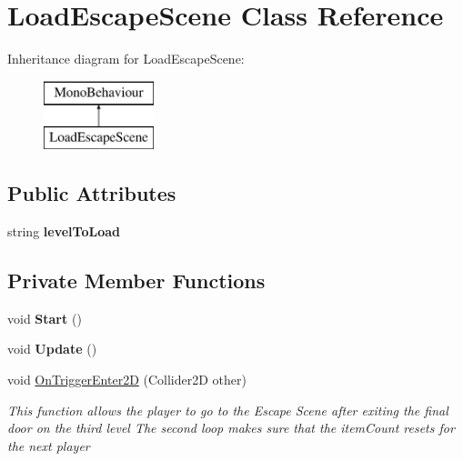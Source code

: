 \hypertarget{class_load_escape_scene}{}\section{Load\+Escape\+Scene Class Reference}
\label{class_load_escape_scene}
Inheritance diagram for Load\+Escape\+Scene\+:\begin{figure}[H]
\begin{center}
\leavevmode
\includegraphics[height=2.000000cm]{class_load_escape_scene}
\end{center}
\end{figure}
\subsection*{Public Attributes}
\begin{DoxyCompactItemize}
\item 
\mbox{\label{class_load_escape_scene_a15d6dcb5e40c53c17e2dc7c2fa7319fb}} 
string {\bfseries level\+To\+Load}
\end{DoxyCompactItemize}
\subsection*{Private Member Functions}
\begin{DoxyCompactItemize}
\item 
\mbox{\label{class_load_escape_scene_a61cdb35e4c56deee7597df7aa16f2877}} 
void {\bfseries Start} ()
\item 
\mbox{\label{class_load_escape_scene_ab7580e84f80f4a3c8b390bf113b82761}} 
void {\bfseries Update} ()
\item 
void \mbox{\hyperlink{class_load_escape_scene_a5fd7bb04123701797923ddee003e3ace}{On\+Trigger\+Enter2D}} (Collider2D other)
\begin{DoxyCompactList}\small\item\em This function allows the player to go to the Escape Scene after exiting the final door on the third level The second loop makes sure that the item\+Count resets for the next player \end{DoxyCompactList}\end{DoxyCompactItemize}


